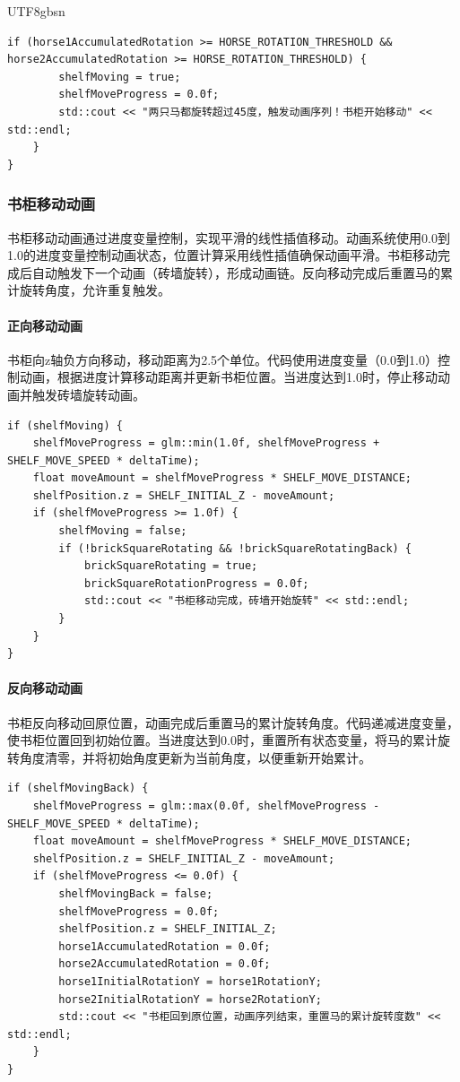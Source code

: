 \documentclass{article}
\begin{document}
\begin{CJK}{UTF8}{gbsn}
\begin{lstlisting}[caption=旋转角度累计计算]
    if (horse1AccumulatedRotation >= HORSE_ROTATION_THRESHOLD && horse2AccumulatedRotation >= HORSE_ROTATION_THRESHOLD) {
        shelfMoving = true;
        shelfMoveProgress = 0.0f;
        std::cout << "两只马都旋转超过45度，触发动画序列！书柜开始移动" << std::endl;
    }
}
\end{lstlisting}

\subsubsection{书柜移动动画}
书柜移动动画通过进度变量控制，实现平滑的线性插值移动。动画系统使用0.0到1.0的进度变量控制动画状态，位置计算采用线性插值确保动画平滑。书柜移动完成后自动触发下一个动画（砖墙旋转），形成动画链。反向移动完成后重置马的累计旋转角度，允许重复触发。

\paragraph{正向移动动画}
书柜向z轴负方向移动，移动距离为2.5个单位。代码使用进度变量（0.0到1.0）控制动画，根据进度计算移动距离并更新书柜位置。当进度达到1.0时，停止移动动画并触发砖墙旋转动画。

\begin{lstlisting}[caption=书柜正向移动动画]
if (shelfMoving) {
    shelfMoveProgress = glm::min(1.0f, shelfMoveProgress + SHELF_MOVE_SPEED * deltaTime);
    float moveAmount = shelfMoveProgress * SHELF_MOVE_DISTANCE;
    shelfPosition.z = SHELF_INITIAL_Z - moveAmount; 
    if (shelfMoveProgress >= 1.0f) {
        shelfMoving = false;
        if (!brickSquareRotating && !brickSquareRotatingBack) {
            brickSquareRotating = true;
            brickSquareRotationProgress = 0.0f;
            std::cout << "书柜移动完成，砖墙开始旋转" << std::endl;
        }
    }
}
\end{lstlisting}

\paragraph{反向移动动画}
书柜反向移动回原位置，动画完成后重置马的累计旋转角度。代码递减进度变量，使书柜位置回到初始位置。当进度达到0.0时，重置所有状态变量，将马的累计旋转角度清零，并将初始角度更新为当前角度，以便重新开始累计。

\begin{lstlisting}[caption=书柜反向移动动画]
if (shelfMovingBack) {
    shelfMoveProgress = glm::max(0.0f, shelfMoveProgress - SHELF_MOVE_SPEED * deltaTime);
    float moveAmount = shelfMoveProgress * SHELF_MOVE_DISTANCE;
    shelfPosition.z = SHELF_INITIAL_Z - moveAmount;
    if (shelfMoveProgress <= 0.0f) {
        shelfMovingBack = false;
        shelfMoveProgress = 0.0f;
        shelfPosition.z = SHELF_INITIAL_Z;
        horse1AccumulatedRotation = 0.0f;
        horse2AccumulatedRotation = 0.0f;
        horse1InitialRotationY = horse1RotationY;
        horse2InitialRotationY = horse2RotationY;
        std::cout << "书柜回到原位置，动画序列结束，重置马的累计旋转度数" << std::endl;
    }
}
\end{lstlisting}


\end{CJK}
\end{document}
